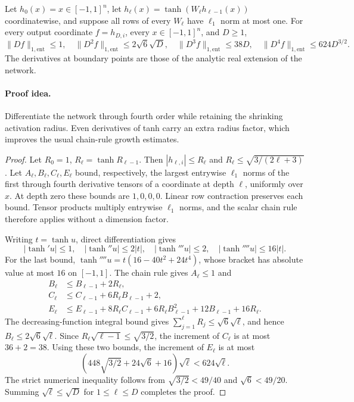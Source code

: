\begin{proposition}
\label{prop:new-critical-derivatives}
Let $h_0(x)=x\in[-1,1]^n$, let
$h_\ell(x)=\tanh(W_\ell h_{\ell-1}(x))$ coordinatewise, and suppose
all rows of every $W_\ell$ have $\ell_1$ norm at most one.
For every output coordinate $f=h_{D,i}$, every $x\in[-1,1]^n$, and
$D\ge1$,
\[
 \|Df\|_{1,\mathrm{ent}}\le1,\quad
 \|D^2f\|_{1,\mathrm{ent}}\le2\sqrt6\sqrt D,\quad
 \|D^3f\|_{1,\mathrm{ent}}\le38D,\quad
 \|D^4f\|_{1,\mathrm{ent}}\le624D^{3/2}.
\]
The derivatives at boundary points are those of the analytic real
extension of the network.
\end{proposition}
\paragraph{Proof idea.}
Differentiate the network through fourth order while retaining the shrinking
activation radius. Even derivatives of tanh carry an extra radius factor,
which improves the usual chain-rule growth estimates.

\begin{proof}
Let $R_0=1$, $R_\ell=\tanh R_{\ell-1}$.  Then
$|h_{\ell,i}|\le R_\ell$ and
$R_\ell\le\sqrt{3/(2\ell+3)}$.
Let $A_\ell,B_\ell,C_\ell,E_\ell$ bound, respectively, the largest
entrywise $\ell_1$ norms of the first through fourth derivative tensors
of a coordinate at depth $\ell$, uniformly over $x$.
At depth zero these bounds are $1,0,0,0$.  Linear row contraction
preserves each bound.  Tensor products multiply entrywise $\ell_1$
norms, and the scalar chain rule therefore applies without a dimension
factor.

Writing $t=\tanh u$, direct differentiation gives
\[
 |\tanh' u|\le1,\quad
 |\tanh''u|\le2|t|,\quad
 |\tanh'''u|\le2,\quad
 |\tanh''''u|\le16|t|.
\]
For the last bound,
$\tanh''''u=t(16-40t^2+24t^4)$, whose bracket has absolute value
at most $16$ on $[-1,1]$.  The chain rule gives $A_\ell\le1$ and
\begin{align*}
 B_\ell&\le B_{\ell-1}+2R_\ell,\\
 C_\ell&\le C_{\ell-1}+6R_\ell B_{\ell-1}+2,\\
 E_\ell&\le E_{\ell-1}+8R_\ell C_{\ell-1}
      +6R_\ell B_{\ell-1}^2+12B_{\ell-1}+16R_\ell.
\end{align*}
The decreasing-function integral bound gives
$\sum_{j=1}^{\ell}R_j\le\sqrt6\sqrt\ell$, and hence
$B_\ell\le2\sqrt6\sqrt\ell$.
Since $R_\ell\sqrt{\ell-1}\le\sqrt{3/2}$, the increment of
$C_\ell$ is at most $36+2=38$.
Using these two bounds, the increment of $E_\ell$ is at most
\[
 \left(448\sqrt{3/2}+24\sqrt6+16\right)\sqrt\ell
 <624\sqrt\ell.
\]
The strict numerical inequality follows from
$\sqrt{3/2}<49/40$ and $\sqrt6<49/20$.
Summing $\sqrt\ell\le\sqrt D$ for $1\le\ell\le D$ completes
the proof.
\end{proof}


